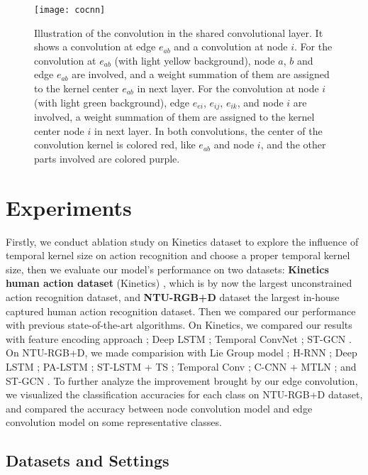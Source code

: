 \documentclass[a4paper,11pt]{article}
\begin{document}
\begin{figure}
\centering
\texttt{[image: cocnn]}
\caption{Illustration of the convolution in the shared convolutional layer. It shows a convolution at edge $e_{ab}$ and a convolution at node $i$. For the convolution at $e_{ab}$ (with light yellow background), node $a$, $b$ and edge $e_{ab}$ are involved, and a weight summation of them are assigned to the kernel center $e_{ab}$ in next layer. For the convolution at node $i$ (with light green background), edge $e_{ei}$, $e_{ij}$, $e_{ik}$, and node $i$ are involved, a weight summation of them are assigned to the kernel center node $i$ in next layer. In both convolutions, the center of the convolution kernel is colored red, like $e_{ab}$ and node $i$, and the other parts involved are colored purple.}
\label{fig:example}
\end{figure}



\section{Experiments}
Firstly, we conduct ablation study on Kinetics dataset to explore the influence of temporal kernel size on action recognition and choose a proper temporal kernel size, then we evaluate our model's performance on two datasets: {\bf Kinetics human action dataset} (Kinetics) \cite{kay2017kinetics}, which is by now the largest unconstrained action recognition dataset, and {\bf NTU-RGB+D} dataset \cite{shahroudy2016ntu} the largest in-house captured human action recognition dataset. Then we compared our performance with previous state-of-the-art algorithms. On Kinetics, we compared our results with feature encoding approach \cite{fernando2015modeling}; Deep LSTM \cite{shahroudy2016ntu}; Temporal ConvNet \cite{soo2017interpretable}; ST-GCN \cite{yan2018spatial}. On NTU-RGB+D, we made comparision with Lie Group model \cite{vemulapalli2014human}; H-RNN \cite{du2015hierarchical}; Deep LSTM \cite{shahroudy2016ntu}; PA-LSTM \cite{shahroudy2016ntu}; ST-LSTM + TS \cite{liu2016spatio}; Temporal Conv \cite{soo2017interpretable}; C-CNN + MTLN \cite{ke2017new}; and ST-GCN \cite{yan2018spatial}. To further analyze the improvement brought by our edge convolution, we visualized the classification accuracies for each class on NTU-RGB+D dataset, and compared the accuracy between node convolution model and edge convolution model on some representative classes.
\subsection{Datasets and Settings}
\end{document}
